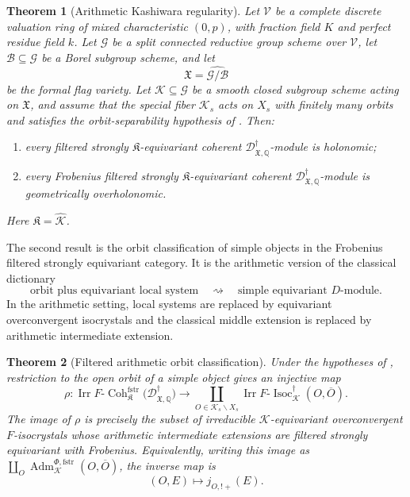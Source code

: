 \documentclass[11pt]{amsart}
\theoremstyle{plain}
\newtheorem{theorem}{Theorem}[section]
\theoremstyle{definition}
\theoremstyle{remark}
\newcommand{\Coh}{\operatorname{Coh}}
\newcommand{\Irr}{\operatorname{Irr}}
\newcommand{\Isoc}{\operatorname{Isoc}}
\newcommand{\fstr}{\mathrm{fstr}}
\newcommand{\Adm}{\operatorname{Adm}}
\begin{document}
\begin{theorem}[Arithmetic Kashiwara regularity]
\label{thm:A-intro}
Let \(\mathcal V\) be a complete discrete valuation ring of mixed
characteristic \((0,p)\), with fraction field \(K\) and perfect residue field
\(k\). Let \(\mathcal G\) be a split connected reductive group scheme over
\(\mathcal V\), let \(\mathcal B\subseteq \mathcal G\) be a Borel subgroup
scheme, and let
\[
  \mathfrak X=\widehat{\mathcal G/\mathcal B}
\]
be the formal flag variety. Let \(\mathcal K\subseteq\mathcal G\) be a smooth
closed subgroup scheme acting on \(\mathfrak X\), and assume that the special
fiber \(\mathcal K_s\) acts on \(X_s\) with finitely many orbits and satisfies
the orbit-separability hypothesis of . Then:
\begin{enumerate}[label=\textup{(\roman*)}]
\item every filtered strongly \(\mathfrak K\)-equivariant coherent
\(\mathscr D^\dagger_{\mathfrak X,\mathbb Q}\)-module is holonomic;
\item every Frobenius filtered strongly \(\mathfrak K\)-equivariant coherent
\(\mathscr D^\dagger_{\mathfrak X,\mathbb Q}\)-module is geometrically
overholonomic.
\end{enumerate}
Here \(\mathfrak K=\widehat{\mathcal K}\).
\end{theorem}

The second result is the orbit classification of simple objects in the Frobenius filtered strongly equivariant category.  It is the
arithmetic version of the classical dictionary
\[
  \text{orbit plus equivariant local system}
  \quad\rightsquigarrow\quad
  \text{simple equivariant }D\text{-module}.
\]
In the arithmetic setting, local systems are replaced by equivariant
overconvergent isocrystals and the classical middle extension is replaced by
arithmetic intermediate extension.

\begin{theorem}[Filtered arithmetic orbit classification]
\label{thm:B-intro}
Under the hypotheses of , restriction to the open orbit of a
simple object gives an injective map
\[
  \rho:
  \Irr F\text{-}\Coh^{\fstr}_{\mathfrak K}
  \bigl(\mathscr D^\dagger_{\mathfrak X,\mathbb Q}\bigr)
  \longrightarrow
  \coprod_{O\in \mathcal K_s\backslash X_s}
  \Irr F\text{-}\Isoc^{\dagger}_{\mathcal K}(O,\overline O).
\]
The image of \(\rho\) is precisely the subset of irreducible
\(\mathcal K\)-equivariant overconvergent \(F\)-isocrystals whose arithmetic
intermediate extensions are filtered strongly equivariant with Frobenius.
Equivalently, writing this image as
\(\coprod_O\Adm^{\Phi,\fstr}_{\mathcal K}(O,\overline O)\), the inverse map is
\[
  (O,E)\longmapsto j_{O,!+}(E).
\]
\end{theorem}
\end{document}
